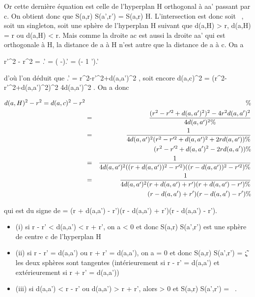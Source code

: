 \documentclass[]{article}
\begin{document}
Or cette dernière équation est celle de l'hyperplan H orthogonal à aa'
passant par c. On obtient donc que S(a,r) \bigcap S(a',r') = S(a,r) \bigcap H.
L'intersection est donc soit \varnothing~, soit un singleton, soit une sphère de
l'hyperplan H suivant que d(a,H) \textgreater{} r, d(a,H) = r ou d(a,H)
\textless{} r. Mais comme la droite ac est aussi la droite aa' qui est
orthogonale à H, la distance de a à H n'est autre que la distance de a à
c. On a

 r'^2 - r^2  =
\overlinebc.\overlineaa' =
(\overlineac
-\overlineab).\overlineaa' =
(\overlineac - 1 
\overlineaa').\overlineaa'

d'où l'on déduit que
\overlineac.\overlineaa' =
r^2-r'^2+d(a,a')^2  , soit encore d(a,c)^2 =
(r^2-r'^2+d(a,a')^2)^2
\over 4d(a,a')^2 . On a donc

\begin{align*} d(a,H)^2 - r^2
= d(a,c)^2 - r^2&& \%&
\\ & =& (r^2 -
r'^2 + d(a,a')^2)^2 -
4r^2d(a,a')^2 \over
4d(a,a')^2 \%& \\ & =& 1
\over 4d(a,a')^2 (r^2 -
r'^2 + d(a,a')^2 + 2rd(a,a')) \%&
\\ & & \quad
(r^2 - r'^2 + d(a,a')^2 - 2rd(a,a'))
\%& \\ & =& 1 \over
4d(a,a')^2 ((r + d(a,a'))^2 -
r'^2)((r - d(a,a'))^2 - r'^2)\%&
\\ & =& 1 \over
4d(a,a')^2 (r + d(a,a') + r')(r + d(a,a') - r') \%&
\\ & & \quad (r - d(a,a')
+ r')(r - d(a,a') - r') \%& \\
\end{align*}

qui est du signe de \delta = (r + d(a,a') - r')(r - d(a,a') + r')(r - d(a,a')
- r').

\begin{itemize}
\itemsep1pt\parskip0pt
\item
  (i) si \textbar{}r - r'\textbar{} \textless{} d(a,a') \textless{} r +
  r', on a \delta \textless{} 0 et donc S(a,r) \bigcap S(a',r') est une sphère de
  centre c de l'hyperplan H
\item
  (ii) si \textbar{}r - r'\textbar{} = d(a,a') ou r + r' = d(a,a'), on a
  \delta = 0 et donc S(a,r) \bigcap S(a',r') =
  \c\~; les deux sphères sont
  tangentes (intérieurement si \textbar{}r - r'\textbar{} = d(a,a') et
  extérieurement si r + r' = d(a,a'))
\item
  (iii) si d(a,a') \textless{} \textbar{}r - r'\textbar{} ou d(a,a')
  \textgreater{} r + r', alors \delta \textgreater{} 0 et S(a,r) \bigcap S(a',r') =
  \varnothing~.
\end{itemize}
\end{document}
